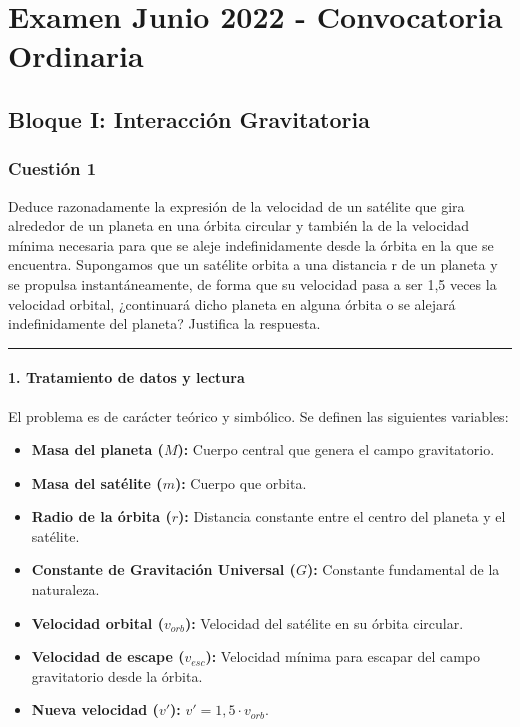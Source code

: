 \chapter{Examen Junio 2022 - Convocatoria Ordinaria}
\label{chap:2022_jun_ord}

\section{Bloque I: Interacción Gravitatoria}
\label{sec:grav_2022_jun_ord}

\subsection{Cuestión 1}
\label{subsec:C1_2022_jun_ord}

\begin{cajaenunciado}
Deduce razonadamente la expresión de la velocidad de un satélite que gira alrededor de un planeta en una órbita circular y también la de la velocidad mínima necesaria para que se aleje indefinidamente desde la órbita en la que se encuentra. Supongamos que un satélite orbita a una distancia r de un planeta y se propulsa instantáneamente, de forma que su velocidad pasa a ser 1,5 veces la velocidad orbital, ¿continuará dicho planeta en alguna órbita o se alejará indefinidamente del planeta? Justifica la respuesta. 
\end{cajaenunciado}
\hrule

\subsubsection*{1. Tratamiento de datos y lectura}
El problema es de carácter teórico y simbólico. Se definen las siguientes variables:
\begin{itemize}
    \item \textbf{Masa del planeta ($M$):} Cuerpo central que genera el campo gravitatorio.
    \item \textbf{Masa del satélite ($m$):} Cuerpo que orbita.
    \item \textbf{Radio de la órbita ($r$):} Distancia constante entre el centro del planeta y el satélite.
    \item \textbf{Constante de Gravitación Universal ($G$):} Constante fundamental de la naturaleza.
    \item \textbf{Velocidad orbital ($v_{orb}$):} Velocidad del satélite en su órbita circular.
    \item \textbf{Velocidad de escape ($v_{esc}$):} Velocidad mínima para escapar del campo gravitatorio desde la órbita.
    \item \textbf{Nueva velocidad ($v'$):} $v' = 1,5 \cdot v_{orb}$.
\end{itemize}

